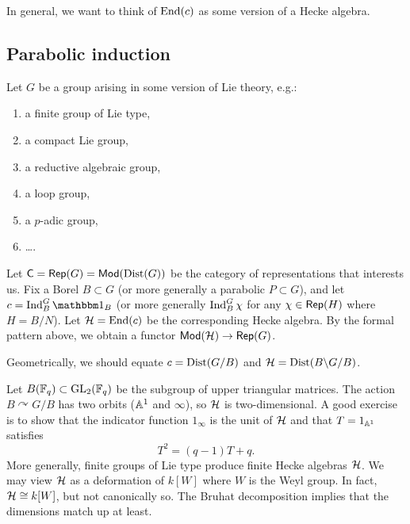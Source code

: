 \documentclass{article}
\begin{document}
In general, we want to think of $\End(c)$ as some version of a Hecke algebra.

\subsection{Parabolic induction}

Let $G$ be a group arising in some version of Lie theory, e.g.:
\begin{enumerate}
	\item a finite group of Lie type,
	\item a compact Lie group,
	\item a reductive algebraic group,
	\item a loop group,
	\item a $p$-adic group,
	\item \dots.
\end{enumerate}

Let $\Csf = \Rep(G) = \Mod(\Dist(G))$ be the category of representations that interests us.
Fix a Borel $B \subset G$ (or more generally a parabolic $P \subset G$), and let $c = \Indop_B^G \onebb_B$ (or more generally $\Ind_B^G \chi$ for any $\chi \in \Rep(H)$ where $H = B / N$).
Let $\Hc = \End(c)$ be the corresponding Hecke algebra.
By the formal pattern above, we obtain a functor $\Mod(\Hc) \to \Rep(G)$.

Geometrically, we should equate $c = \Dist(G / B)$ and $\Hc = \Dist(B \backslash G / B)$.

\begin{ex}
	Let $B(\FF_q) \subset \GL_2(\FF_q)$ be the subgroup of upper triangular matrices.
	The action $B \curvearrowright G / B$ has two orbits ($\AA^1$ and $\infty$), so $\Hc$ is two-dimensional.
	A good exercise is to show that the indicator function $1_{\infty}$ is the unit of $\Hc$ and that $T = 1_{\AA^1}$ satisfies
	\[
		T^2 = (q - 1) T + q.
	\]
	More generally, finite groups of Lie type produce finite Hecke algebras $\Hc$.
	We may view $\Hc$ as a deformation of $k[W]$ where $W$ is the Weyl group.
	In fact, $\Hc \cong k[W]$, but not canonically so.
	The Bruhat decomposition implies that the dimensions match up at least.
\end{ex}
\end{document}
